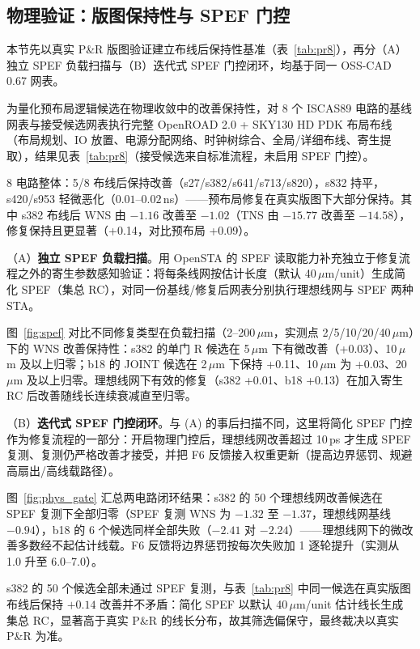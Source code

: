 \documentclass[journal]{IEEEtran}
\begin{document}
\subsection{物理验证：版图保持性与 SPEF 门控}\label{sec:phys_closure}

本节先以真实 P\&R 版图验证建立布线后保持性基准（表~\ref{tab:pr8}），再分（A）独立 SPEF 负载扫描与（B）迭代式 SPEF 门控闭环，均基于同一 OSS-CAD 0.67 网表。

为量化预布局逻辑候选在物理收敛中的改善保持性，对 8 个 ISCAS89 电路的基线网表与接受候选网表执行完整 OpenROAD 2.0 + SKY130 HD PDK 布局布线（布局规划、IO 放置、电源分配网络、时钟树综合、全局/详细布线、寄生提取），结果见表~\ref{tab:pr8}（接受候选来自标准流程，未启用 SPEF 门控）。

8 电路整体：5/8 布线后保持改善（s27/s382/s641/s713/s820），s832 持平，s420/s953 轻微恶化（$0.01$--$0.02\,$ns）——预布局修复在真实版图下大部分保持。其中 s382 布线后 WNS 由 $-1.16$ 改善至 $-1.02$（TNS 由 $-15.77$ 改善至 $-14.58$），修复保持且更显著（+0.14，对比预布局 +0.09）。

（A）\textbf{独立 SPEF 负载扫描}。用 OpenSTA 的 SPEF 读取能力补充独立于修复流程之外的寄生参数感知验证：将每条线网按估计长度（默认 40\,$\mu$m/unit）生成简化 SPEF（集总 RC），对同一份基线/修复后网表分别执行理想线网与 SPEF 两种 STA。

图~\ref{fig:spef} 对比不同修复类型在负载扫描（2--200\,$\mu$m，实测点 2/5/10/20/40\,$\mu$m）下的 WNS 改善保持性：s382 的单门 R 候选在 5\,$\mu$m 下有微改善（+0.03）、10\,$\mu$m 及以上归零；b18 的 JOINT 候选在 2\,$\mu$m 下保持 +0.11、10\,$\mu$m 为 +0.03、20\,$\mu$m 及以上归零。理想线网下有效的修复（s382 +0.01、b18 +0.13）在加入寄生 RC 后改善随线长连续衰减直至归零。

（B）\textbf{迭代式 SPEF 门控闭环}。与 (A) 的事后扫描不同，这里将简化 SPEF 门控作为修复流程的一部分：开启物理门控后，理想线网改善超过 10\,ps 才生成 SPEF 复测、复测仍严格改善才接受，并把 F6 反馈接入权重更新（提高边界惩罚、规避高扇出/高线载路径）。

图~\ref{fig:phys_gate} 汇总两电路闭环结果：s382 的 50 个理想线网改善候选在 SPEF 复测下全部归零（SPEF 复测 WNS 为 $-1.32$ 至 $-1.37$，理想线网基线 $-0.94$），b18 的 6 个候选同样全部失败（$-2.41$ 对 $-2.24$）——理想线网下的微改善多数经不起估计线载。F6 反馈将边界惩罚按每次失败加 1 逐轮提升（实测从 1.0 升至 6.0--7.0）。

s382 的 50 个候选全部未通过 SPEF 复测，与表~\ref{tab:pr8} 中同一候选在真实版图布线后保持 $+0.14$ 改善并不矛盾：简化 SPEF 以默认 40\,$\mu$m/unit 估计线长生成集总 RC，显著高于真实 P\&R 的线长分布，故其筛选偏保守，最终裁决以真实 P\&R 为准。
\end{document}

